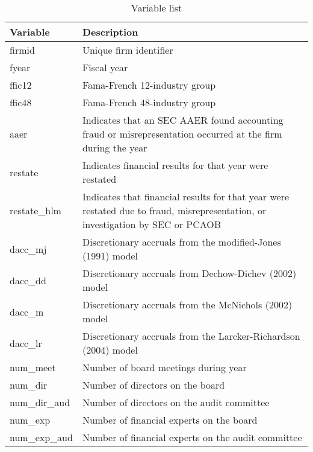\documentclass[11pt]{amsart}
\theoremstyle{definition}
\theoremstyle{question}
\begin{document}
\begin{table}[h]
\caption{Variable list} \label{tab:vars}
    \begin{tabular}{ll}
\textbf{    Variable} & \textbf{Description } \\
    \hline
        firmid & Unique firm identifier \\
        fyear     &    Fiscal year \\
        ffic12     &Fama-French 12-industry group  \\
        ffic48     &    Fama-French 48-industry group \\
        aaer       &    Indicates that an SEC AAER found accounting fraud or     misrepresentation occurred at the firm during the year \\
        restate    &    Indicates financial results for that year were restated \\
        restate\_hlm    & Indicates that financial results for that year were restated due to fraud,     misrepresentation, or investigation by SEC or PCAOB \\
        dacc\_mj & Discretionary accruals from the modified-Jones (1991) model \\
        dacc\_dd  &    Discretionary accruals from Dechow-Dichev (2002) model \\
        dacc\_m & Discretionary accruals from the McNichols (2002) model \\
        dacc\_lr &    Discretionary accruals from the Larcker-Richardson (2004) model \\
        num\_meet    & Number of board meetings during year \\
        num\_dir &     Number of directors on the board \\
        num\_dir\_aud & Number of directors on the audit committee \\
        num\_exp  & Number of financial experts on the board \\
        num\_exp\_aud &     Number of financial experts on the audit committee \\
\end{tabular}    
\end{table}


\end{document}
